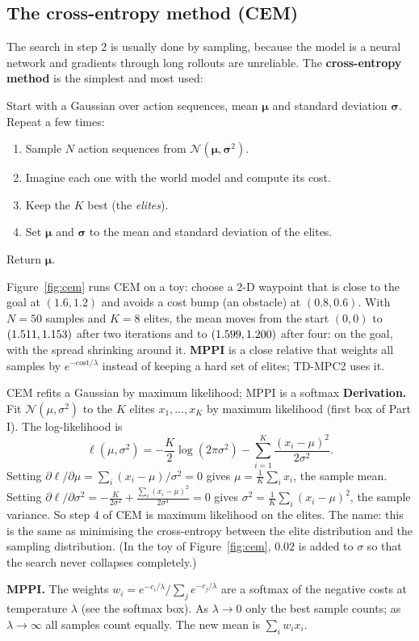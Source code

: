 \subsection{The cross-entropy method (CEM)}
The search in step 2 is usually done by sampling, because the model is a neural network and gradients through long rollouts are unreliable. The \textbf{cross-entropy method} is the simplest and most used:
\begin{algbox}
Start with a Gaussian over action sequences, mean $\bm\mu$ and standard deviation $\bm\sigma$. Repeat a few times:
\begin{enumerate}[leftmargin=*]
\item Sample $N$ action sequences from $\mathcal N(\bm\mu,\bm\sigma^2)$.
\item Imagine each one with the world model and compute its cost.
\item Keep the $K$ best (the \emph{elites}).
\item Set $\bm\mu$ and $\bm\sigma$ to the mean and standard deviation of the elites.
\end{enumerate}
Return $\bm\mu$.
\end{algbox}

Figure~\ref{fig:cem} runs CEM on a toy: choose a 2-D waypoint that is close to the goal at $(1.6,1.2)$ and avoids a cost bump (an obstacle) at $(0.8,0.6)$. With $N=50$ samples and $K=8$ elites, the mean moves from the start $(0,0)$ to $(1.511,1.153)$ after two iterations and to $(1.599,1.200)$ after four: on the goal, with the spread shrinking around it. \textbf{MPPI} is a close relative that weights all samples by $e^{-\text{cost}/\lambda}$ instead of keeping a hard set of elites; TD-MPC2 uses it.

\begin{probbox}{CEM refits a Gaussian by maximum likelihood; MPPI is a softmax}
\textbf{Derivation.} Fit $\mathcal N(\mu,\sigma^2)$ to the $K$ elites $x_1,\dots,x_K$ by maximum likelihood (first box of Part I). The log-likelihood is
\[
\ell(\mu,\sigma^2)=-\frac K2\log(2\pi\sigma^2)-\sum_{i=1}^K\frac{(x_i-\mu)^2}{2\sigma^2}.
\]
Setting $\partial\ell/\partial\mu=\sum_i(x_i-\mu)/\sigma^2=0$ gives $\mu=\frac1K\sum_ix_i$, the sample mean. Setting $\partial\ell/\partial\sigma^2=-\frac{K}{2\sigma^2}+\frac{\sum_i(x_i-\mu)^2}{2\sigma^4}=0$ gives $\sigma^2=\frac1K\sum_i(x_i-\mu)^2$, the sample variance. So step 4 of CEM is maximum likelihood on the elites. The name: this is the same as minimising the cross-entropy between the elite distribution and the sampling distribution. (In the toy of Figure~\ref{fig:cem}, $0.02$ is added to $\sigma$ so that the search never collapses completely.)

\textbf{MPPI.} The weights $w_i=e^{-c_i/\lambda}/\sum_je^{-c_j/\lambda}$ are a softmax of the negative costs at temperature $\lambda$ (see the softmax box). As $\lambda\to0$ only the best sample counts; as $\lambda\to\infty$ all samples count equally. The new mean is $\sum_iw_ix_i$.
\end{probbox}

